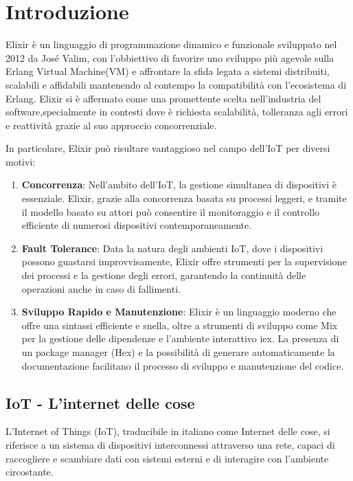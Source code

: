\chapter{Introduzione}

Elixir è un linguaggio di programmazione dinamico e funzionale
sviluppato nel 2012 da José Valim,
con l'obbiettivo di favorire uno sviluppo più agevole
sulla Erlang Virtual Machine(VM) e affrontare la sfida legata
a sistemi distribuiti, scalabili e affidabili mantenendo al
contempo la compatibilità con l'ecosistema di Erlang.
Elixir si è affermato come una promettente scelta
nell'industria del software,specialmente in contesti dove è
richiesta scalabilità, tolleranza agli errori e reattività 
grazie al suo approccio concorrenziale.

In particolare, Elixir può risultare vantaggioso nel
campo dell'IoT per diversi motivi:
\begin{enumerate}
	\item \textbf{Concorrenza}: Nell'ambito dell'IoT, la gestione
	simultanea di dispositivi è essenziale.
	Elixir, grazie alla concorrenza basata su processi leggeri,
	e tramite il modello basato su attori può consentire il monitoraggio
	e il controllo efficiente di numerosi dispositivi contemporaneamente.
	\item \textbf{Fault Tolerance}: 
	Data la natura degli ambienti IoT, dove i dispositivi possono
	guastarsi improvvisamente, Elixir offre strumenti per la supervisione
	dei processi
	e la gestione degli errori, garantendo la continuità delle operazioni
	anche in caso di fallimenti.
	\item \textbf{Sviluppo Rapido e Manutenzione}:
	Elixir è un linguaggio moderno che offre una sintassi efficiente e snella,
	oltre a strumenti di sviluppo come Mix per la gestione delle dipendenze
	e l'ambiente interattivo iex. La presenza di un package manager (Hex)\cite{Hex15:online}
	e la possibilità di generare automaticamente la documentazione
	facilitano il processo di sviluppo e manutenzione del codice.
	
\end{enumerate}

\section{IoT - L'internet delle cose}

L'Internet of Things (IoT),
traducibile in italiano come Internet delle cose,
si riferisce a un sistema di dispositivi interconnessi
attraverso una rete, capaci di raccogliere e scambiare
dati con sistemi esterni e di interagire con l'ambiente circostante.

